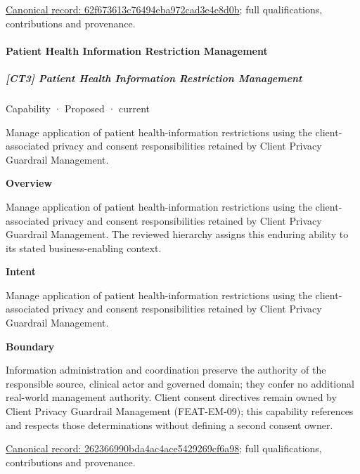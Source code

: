 {\footnotesize \href{../../../../continuum/strategy/capability/62f673613c76494eba972cad3e4e8d0b.md}{Canonical record: 62f673613c76494eba972cad3e4e8d0b}; full qualifications, contributions and provenance.}\par
\paragraph{Patient Health Information Restriction Management}

\subparagraph{[CT3] Patient Health Information Restriction Management}

\label{element:262366990bda4ac4ace5429269cf6a98}
{\small Capability · Proposed · current}\par

Manage application of patient health-information restrictions using the client-associated privacy and consent responsibilities retained by Client Privacy Guardrail Management.



\textbf{Overview}



Manage application of patient health-information restrictions using the client-associated privacy and consent responsibilities retained by Client Privacy Guardrail Management. The reviewed hierarchy assigns this enduring ability to its stated business-enabling context.



\textbf{Intent}



Manage application of patient health-information restrictions using the client-associated privacy and consent responsibilities retained by Client Privacy Guardrail Management.



\textbf{Boundary}



Information administration and coordination preserve the authority of the responsible source, clinical actor and governed domain; they confer no additional real-world management authority. Client consent directives remain owned by Client Privacy Guardrail Management (FEAT-EM-09); this capability references and respects those determinations without defining a second consent owner.


{\footnotesize \href{../../../../continuum/strategy/capability/262366990bda4ac4ace5429269cf6a98.md}{Canonical record: 262366990bda4ac4ace5429269cf6a98}; full qualifications, contributions and provenance.}\par
